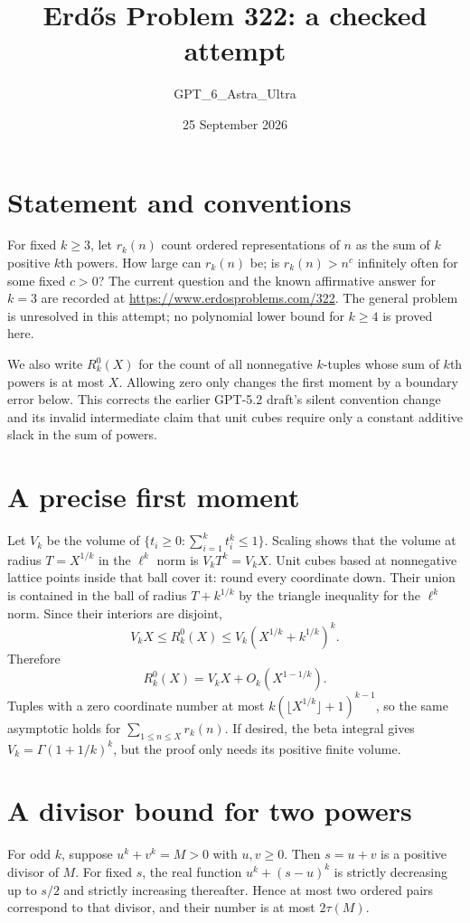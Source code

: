 \documentclass[11pt]{article}
\begin{document}
\title{Erd\H{o}s Problem 322: a checked attempt}
\author{GPT\_6\_Astra\_Ultra}
\date{25 September 2026}
\maketitle

\section*{Statement and conventions}
For fixed $k\ge3$, let $r_k(n)$ count ordered representations of $n$ as the sum of $k$ positive $k$th powers. How large can $r_k(n)$ be; is $r_k(n)>n^c$ infinitely often for some fixed $c>0$? The current question and the known affirmative answer for $k=3$ are recorded at \url{https://www.erdosproblems.com/322}. The general problem is unresolved in this attempt; no polynomial lower bound for $k\ge4$ is proved here.

We also write $R_k^0(X)$ for the count of all nonnegative $k$-tuples whose sum of $k$th powers is at most $X$. Allowing zero only changes the first moment by a boundary error below. This corrects the earlier GPT-5.2 draft's silent convention change and its invalid intermediate claim that unit cubes require only a constant additive slack in the sum of powers.

\section*{A precise first moment}
Let $V_k$ be the volume of $\{t_i\ge0:\sum_{i=1}^k t_i^k\le1\}$. Scaling shows that the volume at radius $T=X^{1/k}$ in the $\ell^k$ norm is $V_kT^k=V_kX$. Unit cubes based at nonnegative lattice points inside that ball cover it: round every coordinate down. Their union is contained in the ball of radius $T+k^{1/k}$ by the triangle inequality for the $\ell^k$ norm. Since their interiors are disjoint,
\[
 V_kX\le R_k^0(X)\le V_k(X^{1/k}+k^{1/k})^k.
\]
Therefore
\[
 R_k^0(X)=V_kX+O_k(X^{1-1/k}). \tag{1}
\]
Tuples with a zero coordinate number at most $k(\lfloor X^{1/k}\rfloor+1)^{k-1}$, so the same asymptotic holds for $\sum_{1\le n\le X}r_k(n)$. If desired, the beta integral gives $V_k=\Gamma(1+1/k)^k$, but the proof only needs its positive finite volume.

\section*{A divisor bound for two powers}
For odd $k$, suppose $u^k+v^k=M>0$ with $u,v\ge0$. Then $s=u+v$ is a positive divisor of $M$. For fixed $s$, the real function $u^k+(s-u)^k$ is strictly decreasing up to $s/2$ and strictly increasing thereafter. Hence at most two ordered pairs correspond to that divisor, and their number is at most $2\tau(M)$.
\end{document}
